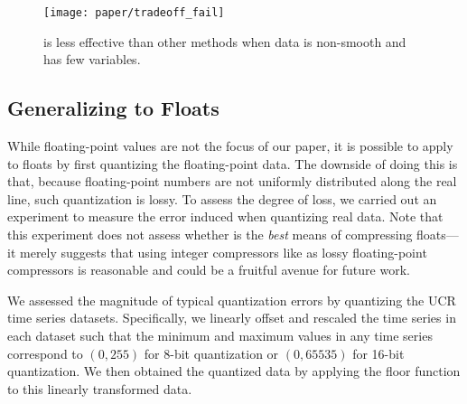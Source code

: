 


\begin{figure}[h]
\begin{center}
    \texttt{[image: paper/tradeoff\_fail]}
    \caption{\minesp is less effective than other methods when data is non-smooth and has few variables.}
    \label{fig:tradeoff_failure}
\end{center}
\end{figure}

\subsection{Generalizing to Floats}

While floating-point values are not the focus of our paper, it is possible to apply \minesp to floats by first quantizing the floating-point data. The downside of doing this is that, because floating-point numbers are not uniformly distributed along the real line, such quantization is lossy. To assess the degree of loss, we carried out an experiment to measure the error induced when quantizing real data. Note that this experiment does not assess whether \minesp is the \textit{best} means of compressing floats---it merely suggests that using integer compressors like \minesp as lossy floating-point compressors is reasonable and could be a fruitful avenue for future work. %

We assessed the magnitude of typical quantization errors by quantizing the UCR time series datasets. Specifically, we linearly offset and rescaled the time series in each dataset such that the minimum and maximum values in any time series correspond to $(0, 255)$ for 8-bit quantization or $(0, 65535)$ for 16-bit quantization. We then obtained the quantized data by applying the floor function to this linearly transformed data.

